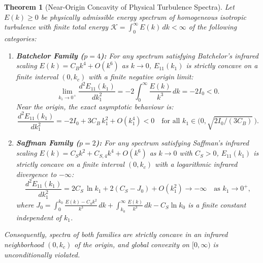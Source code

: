 \documentclass[lineno]{jfm}
\newtheorem{theorem}{Theorem}
\begin{document}
\begin{theorem}[Near-Origin Concavity of Physical Turbulence Spectra]
\label{thm:infrared_concavity}
Let $E(k) \ge 0$ be physically admissible energy spectrum of homogeneous isotropic turbulence with finite total energy $\mathcal{K} = \int_0^\infty E(k)\,dk < \infty$ of the following categories:
\begin{enumerate}
\item \textbf{Batchelor Family ($p = 4$):} For any spectrum satisfying Batchelor's infrared scaling $E(k) = C_B k^4 + O(k^6)$ as $k \to 0$, $E_{11}(k_1)$ is strictly concave on a finite interval $(0, k_c)$ with a finite negative origin limit:
\begin{equation}
\lim_{k_1 \to 0^+} \frac{d^2 E_{11}(k_1)}{d k_1^2} = -2 \int_0^\infty \frac{E(k)}{k^3}\,dk = -2 I_0 < 0.
\label{eq:batchelor_limit}
\end{equation}
Near the origin, the exact asymptotic behaviour is:
\begin{equation}
\frac{d^2 E_{11}(k_1)}{d k_1^2} = -2 I_0 + 3 C_B\,k_1^2 + O(k_1^4) < 0 \quad \text{for all } k_1 \in \big(0, \sqrt{2I_0/(3C_B)}\,\big).
\label{eq:batchelor_asymptotic}
\end{equation}

\item \textbf{Saffman Family ($p = 2$):} For any spectrum satisfying Saffman's infrared scaling $E(k) = C_S k^2 + C_{S,4} k^4 + O(k^6)$ as $k \to 0$ with $C_S > 0$, $E_{11}(k_1)$ is strictly concave on a finite interval $(0, k_c)$ with a logarithmic infrared divergence to $-\infty$:
\begin{equation}
\frac{d^2 E_{11}(k_1)}{d k_1^2} = 2 C_S\,\ln k_1 + 2(C_S - J_0) + O(k_1^2) \longrightarrow -\infty \quad \text{as } k_1 \to 0^+,
\label{eq:saffman_limit}
\end{equation}
where $J_0 = \int_0^{k_0} \frac{E(k) - C_S k^2}{k^3}\,dk + \int_{k_0}^\infty \frac{E(k)}{k^3}\,dk - C_S \ln k_0$ is a finite constant independent of $k_1$.
\end{enumerate}
Consequently, spectra of both families are strictly concave in an infrared neighborhood $(0, k_c)$ of the origin, and global convexity on $[0, \infty)$ is unconditionally violated.
\end{theorem}
\end{document}
